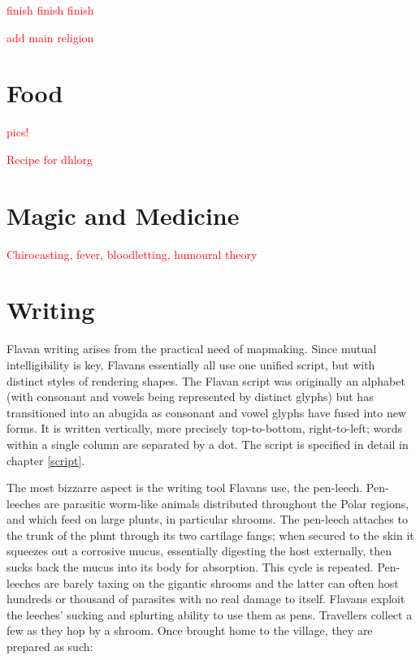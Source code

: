 \documentclass[10pt,oneside]{memoir}
\newcommand{\cmmnt}[1]{\textcolor{red}{#1}}
\begin{document}
\cmmnt{finish finish finish}

\cmmnt{add main religion}

\pagebreak

\section{Food}

\cmmnt{pics!}

\cmmnt{Recipe for dhlorg}

\vfill

\section{Magic and Medicine}

\cmmnt{Chirocasting, fever, bloodletting, humoural theory}


\newpage
\section{Writing}

Flavan writing arises from the practical need of mapmaking. Since mutual intelligibility is key, Flavans essentially all use one unified script, but with distinct styles of rendering shapes. The Flavan script was originally an alphabet (with consonant and vowels being represented by distinct glyphs) but has transitioned into an abugida as consonant and vowel glyphs have fused into new forms. It is written vertically, more precisely top-to-bottom, right-to-left; words within a single column are separated by a dot. The script is specified in detail in chapter \ref{script}.

The most bizzarre aspect is the writing tool Flavans use, the pen-leech. Pen-leeches are parasitic worm-like animals distributed throughout the Polar regions, and which feed on large plunts, in particular shrooms. The pen-leech attaches to the trunk of the plunt through its two cartilage fangs; when secured to the skin it squeezes out a corrosive mucus, essentially digesting the host externally, then sucks back the mucus into its body for absorption. This cycle is repeated. Pen-leeches are barely taxing on the gigantic shrooms and the latter can often host hundreds or thousand of parasites with no real damage to itself. Flavans exploit the leeches' sucking and splurting ability to use them as pens. Travellers collect a few as they hop by a shroom. Once brought home to the village, they are prepared as such:
\end{document}
